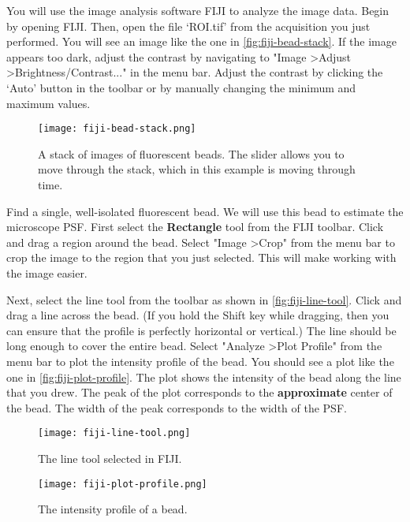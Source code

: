 \documentclass[10pt,a4paper,oneside]{book}
\begin{document}
You will use the image analysis software FIJI to analyze the image data. Begin by opening FIJI. Then, open the file `ROI.tif' from the acquisition you just performed. You will see an image like the one in \autoref{fig:fiji-bead-stack}. If the image appears too dark, adjust the contrast by navigating to "Image \textgreater Adjust \textgreater Brightness/Contrast..." in the menu bar. Adjust the contrast by clicking the `Auto' button in the toolbar or by manually changing the minimum and maximum values.

\begin{figure}[ht]
    \centering
    \texttt{[image: fiji-bead-stack.png]}
    \caption{A stack of images of fluorescent beads. The slider allows you to move through the stack, which in this example is moving through time.}
    \label{fig:fiji-bead-stack}
\end{figure}

Find a single, well-isolated fluorescent bead. We will use this bead to estimate the microscope PSF. First select the \textbf{Rectangle} tool from the FIJI toolbar. Click and drag a region around the bead. Select "Image \textgreater Crop" from the menu bar to crop the image to the region that you just selected. This will make working with the image easier.

Next, select the line tool from the toolbar as shown in \autoref{fig:fiji-line-tool}. Click and drag a line across the bead. (If you hold the Shift key while dragging, then you can ensure that the profile is perfectly horizontal or vertical.) The line should be long enough to cover the entire bead. Select "Analyze \textgreater Plot Profile" from the menu bar to plot the intensity profile of the bead. You should see a plot like the one in \autoref{fig:fiji-plot-profile}. The plot shows the intensity of the bead along the line that you drew. The peak of the plot corresponds to the \textbf{approximate} center of the bead. The width of the peak corresponds to the width of the PSF.

\begin{figure}[ht]
    \centering
    \texttt{[image: fiji-line-tool.png]}
    \caption{The line tool selected in FIJI.}
    \label{fig:fiji-line-tool}
\end{figure}

\begin{figure}[ht]
    \centering
    \texttt{[image: fiji-plot-profile.png]}
    \caption{The intensity profile of a bead.}
    \label{fig:fiji-plot-profile}
\end{figure}
\end{document}
